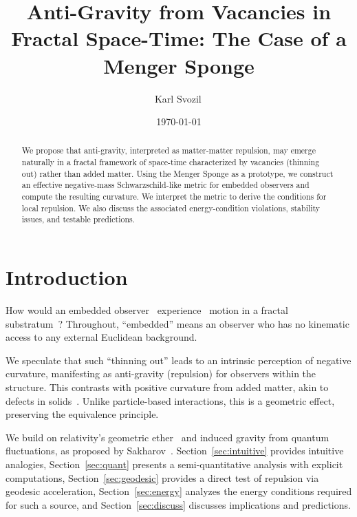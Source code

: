 \documentclass[%
  reprint,
  superscriptaddress,
  showpacs,
  showkeys,
  amsmath,amssymb,
  pra,
  longbibliography,
  floatfix,
]{revtex4-2}
\begin{document}
\title{Anti-Gravity from Vacancies in Fractal Space-Time: The Case of a Menger Sponge}

\author{Karl Svozil\,}

\date{\today}

\begin{abstract}
We propose that anti-gravity, interpreted as matter-matter repulsion, may emerge naturally in a fractal framework of space-time characterized by vacancies (thinning out) rather than added matter. Using the Menger Sponge as a prototype, we construct an effective negative-mass Schwarzschild-like metric for embedded observers and compute the resulting curvature. We interpret the metric to derive the conditions for local repulsion. We also discuss the associated energy-condition violations, stability issues, and testable predictions.
\end{abstract}


\maketitle

\section{Introduction}
\label{sec:intro}

How would an embedded observer~\cite{toffoli:79,svozil-94} experience~\cite{sv1} motion in a fractal~\cite{falconer1} substratum~\cite{Ord-83}? Throughout, ``embedded'' means an observer who has no kinematic access to any external Euclidean background.

We speculate that such ``thinning out'' leads to an intrinsic perception of negative curvature, manifesting as anti-gravity (repulsion) for observers within the structure. This contrasts with positive curvature from added matter, akin to defects in solids~\cite{Kroner-1958,kroner-1990}. Unlike particle-based interactions, this is a geometric effect, preserving the equivalence principle.

We build on relativity's geometric ether~\cite{einstein-aether-en,dirac-aether} and induced gravity from quantum fluctuations, as proposed by Sakharov~\cite{Sakharov-67}. Section~\ref{sec:intuitive} provides intuitive analogies, Section~\ref{sec:quant} presents a semi-quantitative analysis with explicit computations, Section~\ref{sec:geodesic} provides a direct test of repulsion via geodesic acceleration, Section~\ref{sec:energy} analyzes the energy conditions required for such a source, and Section~\ref{sec:discuss} discusses implications and predictions.
\end{document}
